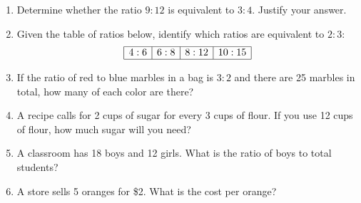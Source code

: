 \documentclass[12pt]{article}
\begin{document}
\begin{tcolorbox}[colframe=black!60, colback=white, 
coltitle=black, colbacktitle=black!15, fonttitle=\bfseries\Large, 
title=Problems, halign title=center, left=10pt, right=10pt, top=10pt, bottom=80pt]
\begin{enumerate}[start=9, itemsep=6em]
    \item Determine whether the ratio \(9:12\) is equivalent to \(3:4\). Justify your answer.

    \item Given the table of ratios below, identify which ratios are equivalent to \(2:3\):  
    \[
    \begin{array}{|c|c|c|c|}
    \hline
    4:6 & 6:8 & 8:12 & 10:15 \\
    \hline
    \end{array}
    \]

    \item If the ratio of red to blue marbles in a bag is \(3:2\) and there are 25 marbles in total, how many of each color are there?

    \item A recipe calls for 2 cups of sugar for every 3 cups of flour. If you use 12 cups of flour, how much sugar will you need?

    \item A classroom has 18 boys and 12 girls. What is the ratio of boys to total students?

    \item A store sells 5 oranges for \$2. What is the cost per orange?

 
\end{enumerate}
\end{tcolorbox}
\end{document}
